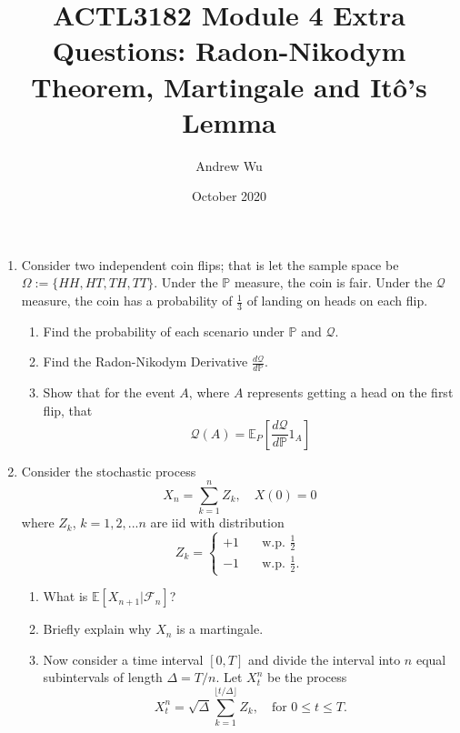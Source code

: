 \documentclass[11pt]{article}
\title{\textbf{ACTL3182 Module 4 Extra Questions: Radon-Nikodym Theorem, Martingale and It\^o's Lemma}}
\author{Andrew Wu}
\date{October 2020}
\newcommand{\E}{\mathbb{E}}
\newcommand{\PR}{\mathbb{P}}
\newcommand{\Q}{\mathcal{Q}}
\begin{document}
	\maketitle
	\begin{enumerate}
		\item Consider two independent coin flips; that is let the sample space be $\Omega:=\{HH, HT, TH, TT\}$. Under the $\PR$ measure, the coin is fair. Under the $\Q$ measure, the coin has a probability of $\frac{1}{3}$ of landing on heads on each flip. 
		\begin{enumerate}
			\item Find the probability of each scenario under $\PR$ and $\Q$.
			\item Find the Radon-Nikodym Derivative $\frac{d\Q}{d\PR}$.
			\item Show that for the event $A$, where $A$ represents getting a head on the first flip, that
			\[	\Q(A) = \E_{P}\left[\frac{d\Q}{d\PR}1_{A}\right]
					\]
 		\end{enumerate}
		\item Consider the stochastic process 
		\[	X_n = \sum_{k=1}^{n}Z_{k},\quad X(0) = 0
			\]
		where $Z_{k}$, $k=1,2,...n$ are iid with distribution 
		\[	Z_{k} = \begin{cases}
						+1 &  \quad \text{w.p. } \frac{1}{2} \\
						-1 & \quad \text{w.p. } \frac{1}{2}.
						\end{cases}
			\]
			\begin{enumerate}
				\item What is $\E[X_{n+1}|\mathcal{F}_{n}]$?
				\item Briefly explain why $X_n$ is a martingale.
				\item Now consider a time interval $[0, T]$ and divide the interval into $n$ equal subintervals of length $\Delta = T/n$. Let $X_t^{n}$ be the process
				\[	X_t^{n} = \sqrt{\Delta}\sum_{k=1}^{\lfloor t/\Delta \rfloor}Z_{k}, \quad \text{for } 0\leq t\leq T. 
				\]
				

\end{enumerate}
\end{enumerate}
\end{document}
